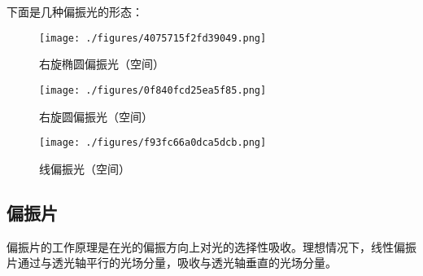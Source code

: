 下面是几种偏振光的形态：

\begin{figure}[ht]
\centering
\texttt{[image: ./figures/4075715f2fd39049.png]}
\caption{右旋椭圆偏振光（空间）} \label{fig_PolLig_4}
\end{figure}


\begin{figure}[ht]
\centering
\texttt{[image: ./figures/0f840fcd25ea5f85.png]}
\caption{右旋圆偏振光（空间）} \label{fig_PolLig_2}
\end{figure}

\begin{figure}[ht]
\centering
\texttt{[image: ./figures/f93fc66a0dca5dcb.png]}
\caption{线偏振光（空间）} \label{fig_PolLig_3}
\end{figure}




\subsection{偏振片}
偏振片的工作原理是在光的偏振方向上对光的选择性吸收。理想情况下，线性偏振片通过与透光轴平行的光场分量，吸收与透光轴垂直的光场分量。

